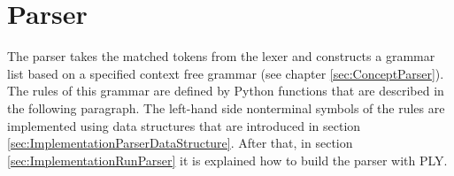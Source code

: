 %
%
%
%
%
%
%
%
%


\section{Parser}\label{sec:ImplementationParser}

The parser takes the matched tokens from the lexer and constructs a grammar list based on a specified context free grammar (see chapter \ref{sec:ConceptParser}).
The rules of this grammar are defined by Python functions that are described in the following paragraph. The left-hand side nonterminal symbols of the rules are implemented using data structures that are introduced in section \ref{sec:ImplementationParserDataStructure}. After that, in section \ref{sec:ImplementationRunParser} it is explained how to build the parser with \ac{PLY}.

